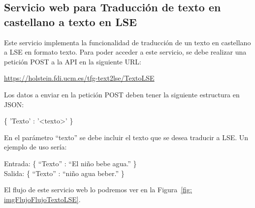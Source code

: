 \subsection{Servicio web para Traducción de texto en castellano a texto en LSE}
Este servicio implementa la funcionalidad de traducción de un texto en castellano a LSE en formato texto.
Para poder acceder a este servicio, se debe realizar una petición POST a la API en la siguiente URL:

\begin{shaded}
	\url{https://holstein.fdi.ucm.es/tfg-text2lse/TextoLSE}	
\end{shaded}


Los datos a enviar en la petición POST deben tener la siguiente estructura en JSON: 
\begin{center}
	
	\{ 'Texto' : '<texto>' \}
	
\end{center}

En el parámetro ``texto'' se debe incluir el texto que se desea traducir a LSE. Un ejemplo de uso sería: 



\begin{center}
	Entrada:  \{ ``Texto'' : ``El niño bebe agua.'' \}\\
	Salida:   \{ ``Texto'' : ``niño agua beber.'' \}
\end{center}


El flujo de este servicio web lo podremos ver en la Figura~\ref {fig: imgFlujoFlujoTextoLSE}.


